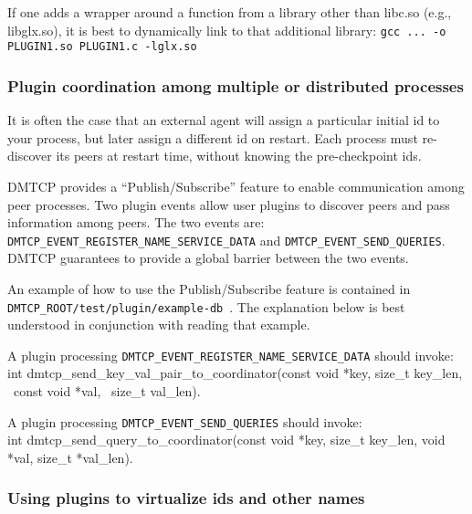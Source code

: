 \documentclass{article}
\begin{document}
If one adds a wrapper around a function from a library other than libc.so
(e.g., libglx.so), it is best to dynamically link to that additional library:
\hfill\break
\medskip\noindent
  \hspace{0.3truein} {\tt gcc ...  -o PLUGIN1.so PLUGIN1.c -lglx.so}
\medskip

\subsubsection{Plugin coordination among multiple or distributed processes}
\label{sec:publishSubscribe}

It is often the case that an external agent will assign a particular
initial id to your process, but later assign a different id on restart.
Each process must re-discover its peers at restart time, without knowing
the pre-checkpoint ids.

DMTCP provides a ``Publish/Subscribe'' feature to enable communication among
peer processes. Two plugin events allow user
plugins to discover peers and pass information among peers.
The two events are:  {\tt DMTCP\_EVENT\_REGISTER\_NAME\_SERVICE\_DATA}
and {\tt DMTCP\_EVENT\_SEND\_QUERIES}.  DMTCP guarantees to provide a global
barrier between the two events.

An example of how to use the Publish/Subscribe feature is contained in
{\tt DMTCP\_ROOT/test/plugin/example-db}~.  The explanation below is best
understood in conjunction with reading that example.

A plugin processing {\tt DMTCP\_EVENT\_REGISTER\_NAME\_SERVICE\_DATA} should invoke: \\
int dmtcp\_send\_key\_val\_pair\_to\_coordinator(const void *key,
                                                   size\_t key\_len, \
                                                   const void *val, \
                                                   size\_t val\_len).

A plugin processing {\tt DMTCP\_EVENT\_SEND\_QUERIES} should invoke: \\
int dmtcp\_send\_query\_to\_coordinator(const void *key, size\_t key\_len,
                                            void *val, size\_t *val\_len).

\subsubsection{Using plugins to virtualize ids and other names}
\label{sec:virtualization}
\end{document}
